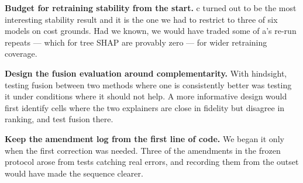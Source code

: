 \textbf{Budget for retraining stability from the start.} c turned out to be the
most interesting stability result and it is the one we had to restrict to three of six
models on cost grounds. Had we known, we would have traded some of a's re-run
repeats --- which for tree SHAP are provably zero --- for wider retraining coverage.

\textbf{Design the fusion evaluation around complementarity.} With hindsight, testing
fusion between two methods where one is consistently better was testing it under
conditions where it should not help. A more informative design would first identify
cells where the two explainers are close in fidelity but disagree in ranking, and test
fusion there.

\textbf{Keep the amendment log from the first line of code.} We began it only when the
first correction was needed. Three of the amendments in the frozen protocol arose from
tests catching real errors, and recording them from the outset would have made the
sequence clearer.
